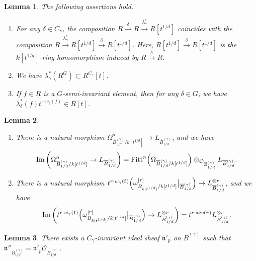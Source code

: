 \documentclass[10pt,a4paper]{amsart}
\newtheorem{lem}{Lemma}
\begin{document}
\begin{lem}\label{lem:lambda}
The following assertions hold. 
\begin{enumerate}
\item 
For any $\delta \in C_{\gamma}$, the composition $R \xrightarrow{\delta} R \xrightarrow{\lambda ^* _{\gamma}} R[t^{1/d}]$ coincides with the composition $R \xrightarrow{\lambda ^* _{\gamma}} R[t^{1/d}] \xrightarrow{\delta} R[t^{1/d}]$. 
Here, $R[t^{1/d}] \xrightarrow{\delta} R[t^{1/d}]$ is the $k[t^{1/d}]$-ring homomorphism induced by $R \xrightarrow{\delta} R$.

\item
We have 
$\lambda^* _{\gamma} \left( R^G \right) \subset R^{C_{\gamma}}[t]$. 

\item 
If $f \in R$ is a $G$-semi-invariant element, then 
for any $\delta \in G$, we have $\lambda ^* _{\delta}(f)t^{-w_{\delta}(f)} \in R[t]$.
\end{enumerate}
\end{lem}

\begin{lem}\label{lem:L}
\begin{enumerate}
\item
There is a natural morphism $\Omega ^n _{\overline{B}^{(\gamma)}_{1/d}/k[t^{1/d}]} \to L_{\overline{B}^{(\gamma)}_{1/d}}$, and we have
\[
\operatorname{Im} \left ( \Omega ^n _{\overline{B}^{(\gamma)}_{1/d}/k[t^{1/d}]} \to L_{\overline{B}^{(\gamma)}_{1/d}} \right)  = \operatorname{Fitt}^n \Bigl ( \Omega _{\overline{B}^{(\gamma)}_{1/d}/k[t^{1/d}]} \Bigr ) \otimes _{\mathcal{O}_{\overline{B}^{(\gamma)}_{1/d}}} L_{\overline{B}^{(\gamma)}_{1/d}}.
\]  

\item
There is a natural morphism $t^{r \cdot w_{\gamma}({\bf f})} \Bigl ( \omega^{[r]} _{B_{k[t^{1/d}]}/k[t^{1/d}]} \big| _{\overline{B}^{(\gamma)}_{1/d}} \Bigr ) \to L_{\overline{B}^{(\gamma)}_{1/d}}^{\otimes r}$, 
and we have
\[
\operatorname{Im} \left (t^{r \cdot w_{\gamma}({\bf f})} \Bigl ( \omega^{[r]} _{B_{k[t^{1/d}]}/k[t^{1/d}]} \big| _{\overline{B}^{(\gamma)}_{1/d}} \Bigr ) \to L_{\overline{B}^{(\gamma)}_{1/d}}^{\otimes r} \right)
= t^{r \cdot \operatorname{age}(\gamma)} L_{\overline{B}^{(\gamma)}_{1/d}}^{\otimes r}. 
\]
\end{enumerate}
\end{lem}

\begin{lem}\label{lem:L4}
There exists a $C_{\gamma}$-invariant ideal sheaf $\mathfrak{n}'_{p}$ on $\overline{B}^{(\gamma)}$ such that 
$\mathfrak{n}''_{\overline{B}^{(\gamma)}_{1/d}} = \mathfrak{n}'_{p} \mathcal{O}_{\overline{B}^{(\gamma)}_{1/d}}$. 
\end{lem}
\end{document}

